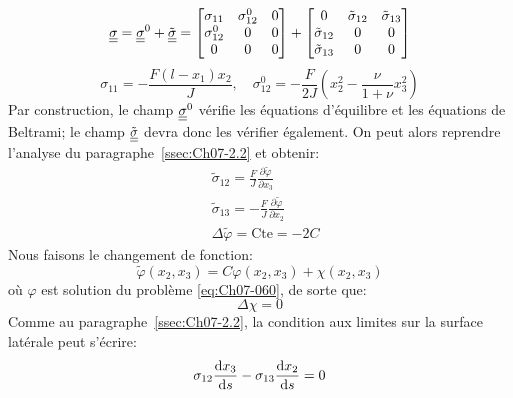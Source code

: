 \begin{equation}
    \underline{\underline{\sigma}} = \underline{\underline{\sigma}}^0 + \tilde{\underline{\underline{\sigma}}} = 
    \begin{bmatrix}
        \sigma_{11} & \sigma_{12}^0 & 0 \\
        \sigma_{12}^0 & 0 & 0 \\
        0 & 0 & 0
    \end{bmatrix}
    +
    \begin{bmatrix}
        0 & \tilde{\sigma}_{12} & \tilde{\sigma}_{13} \\
        \tilde{\sigma}_{12} & 0 & 0 \\
        \tilde{\sigma}_{13} & 0 & 0
    \end{bmatrix}
    \label{eq:Ch07-100}
\end{equation}
\begin{equation}
    \sigma_{11} = -\frac{F(l-x_1)x_2}{J},\quad \sigma_{12}^0 = -\frac{F}{2J} \left( x_2^2 - \frac{\nu}{1+\nu}x_3^2 \right)
    \label{eq:Ch07-101}
\end{equation}
Par construction, le champ $\underline{\underline{\sigma}}^0$ vérifie les équations d'équilibre 
et les équations de Beltrami; le champ $\tilde{\underline{\underline{\sigma}}}$  devra donc les vérifier également.
On peut alors reprendre l'analyse du paragraphe~\ref{ssec:Ch07-2.2} et obtenir: 
\begin{equation}
    \begin{aligned}
       & \tilde{\sigma}_{12} = \frac{F}{J} \frac{\partial \tilde{\varphi}}{\partial x_3} \\& \tilde{\sigma}_{13} = - \frac{F}{J} \frac{\partial \tilde{\varphi}}{\partial x_2} \\
        &\Delta \tilde{\varphi} = \text{Cte} = -2C
    \end{aligned}
    \label{eq:Ch07-102}
\end{equation}
Nous faisons le changement de fonction: 
\begin{equation}
    \tilde{\varphi} (x_2,x_3) = C\varphi(x_2,x_3) + \chi (x_2,x_3)
    \label{eq:Ch07-103}
\end{equation}
où $\varphi$ est solution du problème \eqref{eq:Ch07-060}, de sorte que:
\begin{equation}
    \Delta\chi = 0
    \label{eq:Ch07-104}
\end{equation}
Comme au paragraphe~\ref{ssec:Ch07-2.2}, la condition aux limites sur la surface latérale peut s'écrire: 
\begin{displaymath}
    \sigma_{12} \frac{\mathop{\mathrm{{}d}}\mathopen{} x_3}{\mathop{\mathrm{{}d}}\mathopen{} s} - \sigma_{13} \frac{\mathop{\mathrm{{}d}}\mathopen{} x_2}{\mathop{\mathrm{{}d}}\mathopen{} s} = 0
\end{displaymath}

